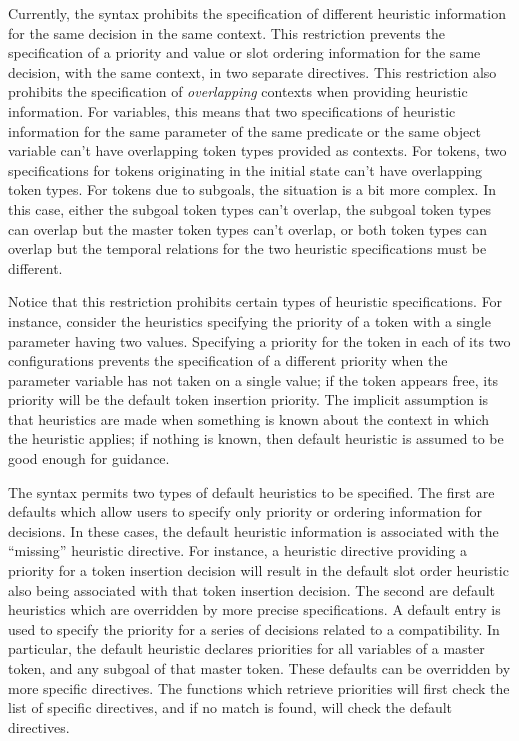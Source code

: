 Currently, the syntax prohibits the specification of different
heuristic information for the same decision in the same context.
This restriction prevents the specification of a priority and value or
slot ordering information for the same decision, with the same
context, in two separate directives.  This restriction also
prohibits the specification of {\em overlapping} contexts when
providing heuristic information.  For variables, this means that two
specifications of heuristic information for the same parameter of the
same predicate or the same object variable can't have overlapping
token types provided as contexts.  For tokens, two specifications for
tokens originating in the initial state can't have overlapping token
types.  For tokens due to subgoals, the situation is a bit more
complex.  In this case, either the subgoal token types can't overlap,
the subgoal token types can overlap but the master token types can't
overlap, or both token types can overlap but the temporal relations
for the two heuristic specifications must be different.

Notice that this restriction prohibits certain types of heuristic
specifications.  For instance, consider the heuristics specifying the
priority of a token with a single parameter having two values.
Specifying a priority for the token in each of its two configurations
prevents the specification of a different priority when the parameter
variable has not taken on a single value; if the token appears free,
its priority will be the default token insertion priority.  
The implicit assumption is that heuristics are made when something
is known about the context in which the heuristic applies; if nothing
is known, then default heuristic is assumed to be good
enough for guidance.

The syntax permits two types of default heuristics to be specified. 
The first are defaults which allow users to specify only priority or
ordering information for decisions.  In these cases, the default
heuristic information is associated with the ``missing'' heuristic
directive.  For instance, a heuristic directive providing a priority
for a token insertion decision will result in the default slot order
heuristic also being associated with that token insertion decision. 
The second are default heuristics which are overridden by more precise
specifications.  A default entry is used to specify the priority for a
series of decisions related to a compatibility.  In particular, the
default heuristic declares priorities for all variables of a master
token, and any subgoal of that master token.  These defaults can be
overridden by more specific directives.  The functions which retrieve
priorities will first check the list of specific directives, and if no
match is found, will check the default directives.

